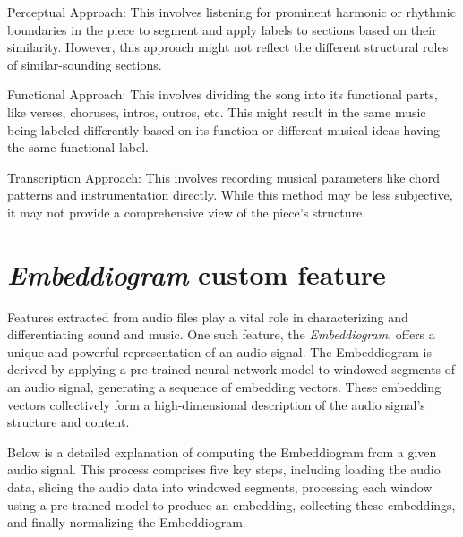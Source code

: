 Perceptual Approach: This involves listening for prominent harmonic or rhythmic boundaries in the piece to segment and apply labels to sections based on their similarity. However, this approach might not reflect the different structural roles of similar-sounding sections.

Functional Approach: This involves dividing the song into its functional parts, like verses, choruses, intros, outros, etc. This might result in the same music being labeled differently based on its function or different musical ideas having the same functional label.

Transcription Approach: This involves recording musical parameters like chord patterns and instrumentation directly. While this method may be less subjective, it may not provide a comprehensive view of the piece's structure.

\section{\textit{Embeddiogram} custom feature}

Features extracted from audio files play a vital role in characterizing and differentiating sound and music. One such feature, the \textit{Embeddiogram}, offers a unique and powerful representation of an audio signal. The Embeddiogram is derived by applying a pre-trained neural network model to windowed segments of an audio signal, generating a sequence of embedding vectors. These embedding vectors collectively form a high-dimensional description of the audio signal's structure and content.

Below is a detailed explanation of computing the Embeddiogram from a given audio signal. This process comprises five key steps, including loading the audio data, slicing the audio data into windowed segments, processing each window using a pre-trained model to produce an embedding, collecting these embeddings, and finally normalizing the Embeddiogram. 

